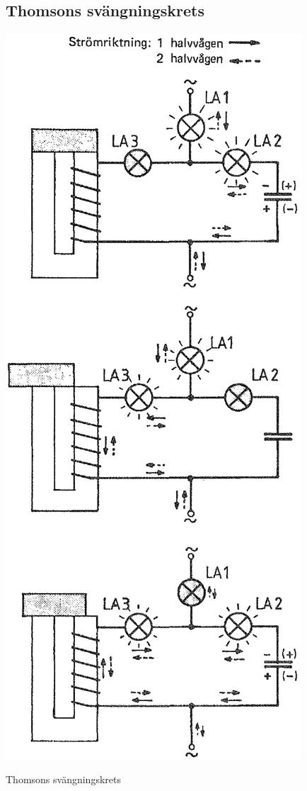 \subsection{Thomsons svängningskrets}

\begin{marginfigure}
  \includegraphics[width=\textwidth]{images/cropped_pdfs/bild_2_3-17.pdf}
  \caption{Thomsons svängningskrets}
  \label{fig:BildII3-17}
\end{marginfigure}

